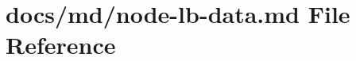 \hypertarget{node-lb-data_8md}{}\section{docs/md/node-\/lb-\/data.md File Reference}
\label{node-lb-data_8md}
